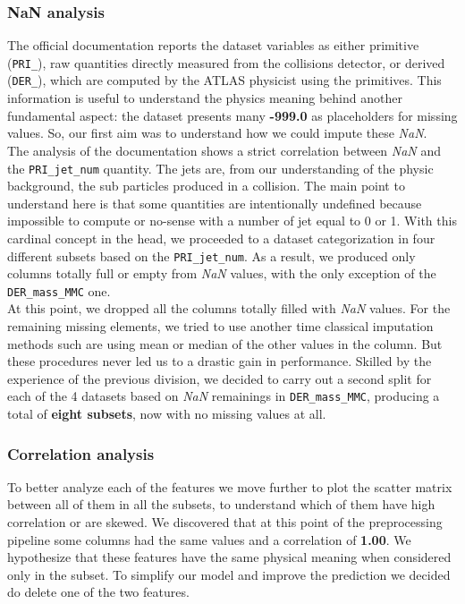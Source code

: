 \documentclass[10pt,article]{IEEEtran}
\begin{document}
\subsubsection{NaN analysis} The official documentation \cite{higghsdoc} reports the dataset variables as either primitive (\texttt{PRI\_}), raw quantities directly measured from the collisions detector, or derived (\texttt{DER\_}), which are computed by the ATLAS physicist using the primitives. This information is useful to understand the physics meaning behind another fundamental aspect: the dataset presents many \textbf{-999.0} as placeholders for missing values. So, our first aim was to understand how we could impute these \textit{NaN}.\\
The analysis of the documentation shows a strict correlation between \textit{NaN} and the \texttt{PRI\_jet\_num} quantity. The jets are, from our understanding of the physic background, the sub particles produced in a collision. The main point to understand here is that some quantities are intentionally undefined because impossible to compute or no-sense with a number of jet equal to 0 or 1. With this cardinal concept in the head, we proceeded to a dataset categorization in four different subsets based on the \texttt{PRI\_jet\_num}. As a result, we produced only columns totally full or empty from \textit{NaN} values, with the only exception of the \texttt{DER\_mass\_MMC} one.\\
At this point, we dropped all the columns totally filled with \textit{NaN} values. For the remaining missing elements, we tried to use another time classical imputation methods such are using mean or median of the other values in the column. But these procedures never led us to a drastic gain in performance. Skilled by the experience of the previous division, we decided to carry out a second split for each of the 4 datasets based on \textit{NaN} remainings in \texttt{DER\_mass\_MMC}, producing a total of \textbf{eight subsets}, now with no missing values at all.
\subsubsection{Correlation analysis} To better analyze each of the features we move further to plot the scatter matrix between all of them in all the subsets, to understand which of them have high correlation or are skewed. We discovered that at this point of the preprocessing pipeline some columns had the same values and a correlation of \textbf{1.00}. We hypothesize that these features have the same physical meaning when considered only in the subset. To simplify our model and improve the prediction we decided do delete one of the two features.
\end{document}
